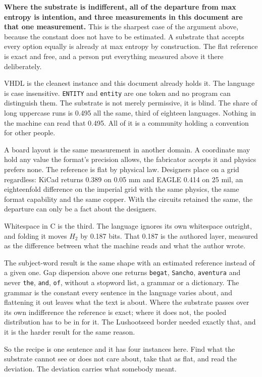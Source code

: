 \textbf{Where the substrate is indifferent, all of the departure from max entropy is intention, and three measurements in this document are that one measurement.} This is the sharpest case of the argument above, because the constant does not have to be estimated. A substrate that accepts every option equally is already at max entropy by construction. The flat reference is exact and free, and a person put everything measured above it there deliberately.

VHDL is the cleanest instance and this document already holds it. The language is case insensitive. \texttt{ENTITY} and \texttt{entity} are one token and no program can distinguish them. The substrate is not merely permissive, it is blind. The share of long uppercase runs is 0.495 all the same, third of eighteen languages. Nothing in the machine can read that 0.495. All of it is a community holding a convention for other people.

A board layout is the same measurement in another domain. A coordinate may hold any value the format's precision allows, the fabricator accepts it and physics prefers none. The reference is flat by physical law. Designers place on a grid regardless: KiCad returns 0.389 on 0.05 mm and EAGLE 0.414 on 25 mil, an eighteenfold difference on the imperial grid with the same physics, the same format capability and the same copper. With the circuits retained the same, the departure can only be a fact about the designers.

Whitespace in C is the third. The language ignores its own whitespace outright, and folding it moves \(H_2\) by 0.187 bits. That 0.187 is the authored layer, measured as the difference between what the machine reads and what the author wrote.

The subject-word result is the same shape with an estimated reference instead of a given one. Gap dispersion above one returns \texttt{begat}, \texttt{Sancho}, \texttt{aventura} and never \texttt{the}, \texttt{and}, \texttt{of}, without a stopword list, a grammar or a dictionary. The grammar is the constant every sentence in the language varies about, and flattening it out leaves what the text is about. Where the substrate passes over its own indifference the reference is exact; where it does not, the pooled distribution has to be in for it. The Lushootseed border needed exactly that, and it is the harder result for the same reason.

So the recipe is one sentence and it has four instances here. Find what the substrate cannot see or does not care about, take that as flat, and read the deviation. The deviation carries what somebody meant.

